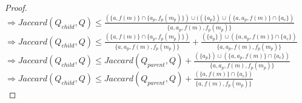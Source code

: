 \begin{proof}
$\Rightarrow Jaccard(Q_{child},Q)   \leq    \frac{\left( \{a,f(m) \} \cap \{ a_p, f_p(m_p) \}  \right) \cup (\left( \{ a_p\} \right) \cup \left(  \{a, a_p,f(m) \} \cap \{ a_c \}  \right)}{\{  a,a_p, f(m),  f_p(m_p)  \} }  $\\


$\Rightarrow Jaccard(Q_{child},Q)   \leq    \frac{\left( \{a,f(m) \} \cap \{ a_p, f_p(m_p) \}  \right)}{\{  a,a_p, f(m),  f_p(m_p)  \} } +  \frac{\left( \{ a_p\} \right) \cup \left(  \{a, a_p,f(m) \} \cap \{ a_c \}  \right)}{\{  a,a_p, f(m),  f_p(m_p)  \} }  $\\

$\Rightarrow Jaccard(Q_{child},Q)   \leq   Jaccard(Q_{parent}, Q) +  \frac{\left( \{ a_p\} \right) \cup \left(  \{a, a_p,f(m) \} \cap \{ a_c \}  \right)}{\{  a,a_p, f(m),  f_p(m_p)  \} }  $\\

$\Rightarrow Jaccard(Q_{child},Q)   \leq   Jaccard(Q_{parent}, Q) +  \frac{ \left(  \{a, f(m) \} \cap \{ a_c \}  \right)}{\{  a, f(m),  f_p(m_p)  \} }  $\\

\end{proof}



